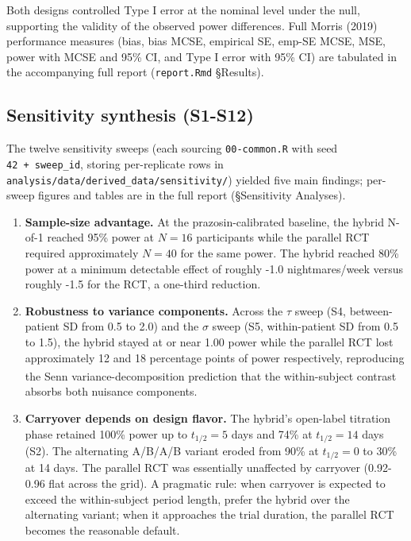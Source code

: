 \documentclass[
  11pt,
]{article}
\begin{document}
Both designs controlled Type I error at the nominal level under
the null, supporting the validity of the observed power
differences. Full Morris (2019) performance measures
(bias, bias MCSE, empirical SE, emp-SE MCSE, MSE, power with
MCSE and 95\% CI, and Type I error with 95\% CI) are tabulated in
the accompanying full report (\texttt{report.Rmd} §Results).

\subsection{Sensitivity synthesis (S1-S12)}\label{sensitivity-synthesis-s1-s12}

The twelve sensitivity sweeps (each sourcing \texttt{00-common.R} with
seed \texttt{42\ +\ sweep\_id}, storing per-replicate rows in
\texttt{analysis/data/derived\_data/sensitivity/}) yielded five main
findings; per-sweep figures and tables are in the full report
(§Sensitivity Analyses).

\begin{enumerate}
\def\labelenumi{\arabic{enumi}.}
\item
  \textbf{Sample-size advantage.} At the prazosin-calibrated
  baseline, the hybrid N-of-1 reached 95\% power at \(N = 16\)
  participants while the parallel RCT required approximately
  \(N = 40\) for the same power. The hybrid reached 80\% power at
  a minimum detectable effect of roughly -1.0 nightmares/week
  versus roughly -1.5 for the RCT, a one-third reduction.
\item
  \textbf{Robustness to variance components.} Across the \(\tau\)
  sweep (S4, between-patient SD from 0.5 to 2.0) and the
  \(\sigma\) sweep (S5, within-patient SD from 0.5 to 1.5), the
  hybrid stayed at or near 1.00 power while the parallel RCT
  lost approximately 12 and 18 percentage points of power
  respectively, reproducing the Senn\textsuperscript{} variance-decomposition
  prediction that the within-subject contrast absorbs both
  nuisance components.
\item
  \textbf{Carryover depends on design flavor.} The hybrid's
  open-label titration phase retained 100\% power up to
  \(t_{1/2} = 5\) days and 74\% at \(t_{1/2} = 14\) days (S2). The
  alternating A/B/A/B variant eroded from 90\% at \(t_{1/2} = 0\)
  to 30\% at 14 days. The parallel RCT was essentially
  unaffected by carryover (0.92-0.96 flat across the grid). A
  pragmatic rule: when carryover is expected to exceed the
  within-subject period length, prefer the hybrid over the
  alternating variant; when it approaches the trial duration,
  the parallel RCT becomes the reasonable default.
\end{enumerate}
\end{document}
